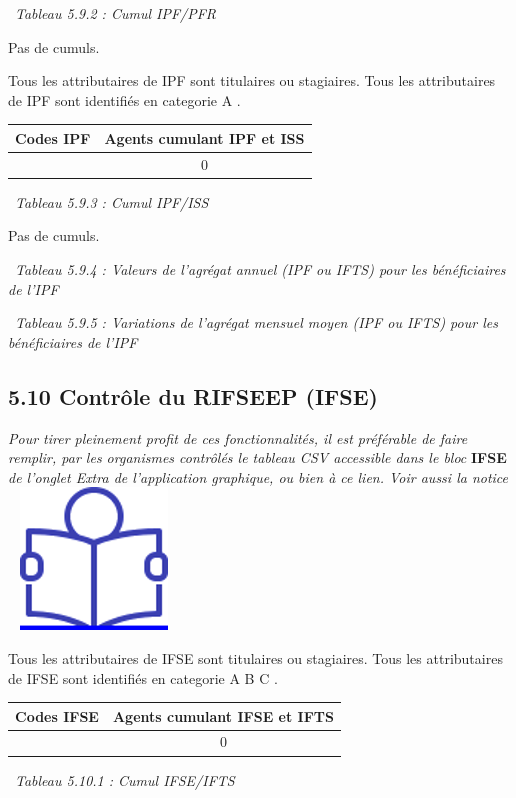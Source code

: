 ~\emph{Tableau 5.9.2 : Cumul IPF/PFR}

Pas de cumuls.

Tous les attributaires de IPF sont titulaires ou stagiaires. Tous les
attributaires de IPF sont identifiés en categorie A .

\begin{longtable}[]{@{}cc@{}}
\toprule
Codes IPF & Agents cumulant IPF et ISS\tabularnewline
\midrule
\endhead
& 0\tabularnewline
\bottomrule
\end{longtable}

~\emph{Tableau 5.9.3 : Cumul IPF/ISS}

Pas de cumuls.

~\emph{Tableau 5.9.4 : Valeurs de l'agrégat annuel (IPF ou IFTS) pour
les bénéficiaires de l'IPF}

~\emph{Tableau 5.9.5 : Variations de l'agrégat mensuel moyen (IPF ou
IFTS) pour les bénéficiaires de l'IPF}

\hypertarget{controle-du-rifseep-ifse}{%
\subsection{5.10 Contrôle du RIFSEEP
(IFSE)}\label{controle-du-rifseep-ifse}}

\emph{Pour tirer pleinement profit de ces fonctionnalités, il est
préférable de faire remplir, par les organismes contrôlés le tableau CSV
accessible dans le bloc} \textbf{IFSE} \emph{de l'onglet Extra de
l'application graphique, ou bien à ce lien. Voir aussi la notice} ~
\href{../Docs/Notices/fiche_tableau_ifse.odt}{\includegraphics{icones/Notice.png}}

Tous les attributaires de IFSE sont titulaires ou stagiaires. Tous les
attributaires de IFSE sont identifiés en categorie A B C .

\begin{longtable}[]{@{}cc@{}}
\toprule
Codes IFSE & Agents cumulant IFSE et IFTS\tabularnewline
\midrule
\endhead
& 0\tabularnewline
\bottomrule
\end{longtable}

~\emph{Tableau 5.10.1 : Cumul IFSE/IFTS}

